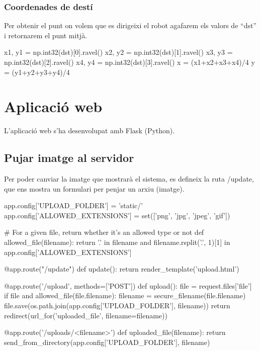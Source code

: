 		\subsubsection{Coordenades de destí}
Per obtenir el punt on volem que es dirigeixi el robot agafarem els valors de ``dst'' i retornarem el punt mitjà.\\
		\begin{python}
		x1, y1 = np.int32(dst)[0].ravel()
		x2, y2 = np.int32(dst)[1].ravel()
		x3, y3 = np.int32(dst)[2].ravel()
		x4, y4 = np.int32(dst)[3].ravel()
		x = (x1+x2+x3+x4)/4
		y = (y1+y2+y3+y4)/4
		\end{python}

\newpage
\section{Aplicació web}
	L'aplicació web s'ha desenvolupat amb Flask (Python).
	\subsection{Pujar imatge al servidor}
		Per poder canviar la imatge que mostrarà el sistema, es defineix la ruta /update, que ens mostra un formulari per penjar un arxiu (imatge).\\
		\begin{python}
app.config['UPLOAD_FOLDER'] = 'static/'
app.config['ALLOWED_EXTENSIONS'] = set(['png', 'jpg', 'jpeg', 'gif'])

# For a given file, return whether it's an allowed type or not
def allowed_file(filename):
	return '.' in filename and 
		filename.rsplit('.', 1)[1] in app.config['ALLOWED_EXTENSIONS']

@app.route("/update")
def update():
	return render_template('upload.html')

@app.route('/upload', methods=['POST'])
def upload():
	file = request.files['file']
	if file and allowed_file(file.filename):
		filename = secure_filename(file.filename)
		file.save(os.path.join(app.config['UPLOAD_FOLDER'], filename))
		return redirect(url_for('uploaded_file', filename=filename))

@app.route('/uploads/<filename>')
def uploaded_file(filename):
	return send_from_directory(app.config['UPLOAD_FOLDER'], filename)
		\end{python}

